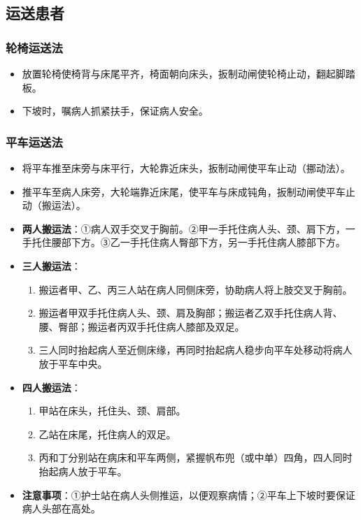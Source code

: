 \documentclass[11pt, a4paper]{ctexart}
\begin{document}
\subsection{运送患者}
\subsubsection{轮椅运送法}
\begin{itemize}
	\item 放置轮椅使椅背与床尾平齐，椅面朝向床头，扳制动闸使轮椅止动，翻起脚踏板。
	\item 下坡时，嘱病人抓紧扶手，保证病人安全。
\end{itemize}

\subsubsection{平车运送法}
\begin{itemize}
	\item 将平车推至床旁与床平行，大轮靠近床头，扳制动闸使平车止动（挪动法）。
	\item 推平车至病人床旁，大轮端靠近床尾，使平车与床成钝角，扳制动闸使平车止动（搬运法）。
	\item \textbf{两人搬运法}：①病人双手交叉于胸前。②甲一手托住病人头、颈、肩下方，一手托住腰部下方。③乙一手托住病人臀部下方，另一手托住病人膝部下方。
	\item \textbf{三人搬运法}：
	      \begin{enumerate}
		      \item 搬运者甲、乙、丙三人站在病人同侧床旁，协助病人将上肢交叉于胸前。
		      \item 搬运者甲双手托住病人头、颈、肩及胸部；搬运者乙双手托住病人背、腰、臀部；搬运者丙双手托住病人膝部及双足。
		      \item 三人同时抬起病人至近侧床缘，再同时抬起病人稳步向平车处移动将病人放于平车中央。
	      \end{enumerate}
	\item \textbf{四人搬运法}：
	      \begin{enumerate}
		      \item 甲站在床头，托住头、颈、肩部。
		      \item 乙站在床尾，托住病人的双足。
		      \item 丙和丁分别站在病床和平车两侧，紧握帆布兜（或中单）四角，四人同时抬起病人放于平车。
	      \end{enumerate}
	\item \textbf{注意事项}：①护士站在病人头侧推运，以便观察病情；②平车上下坡时要保证病人头部在高处。
\end{itemize}
\end{document}
